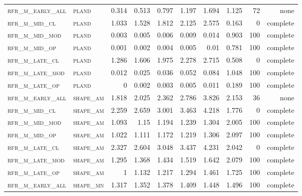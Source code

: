 \begin{landscape}
\begin{center}
\begin{footnotesize}
\begin{longtable}{llrrrrr|rrr}
\textsc{rfr\_m\_early\_all} & \textsc{pland     }   & 0.314   & 0.513   & 0.797   & 1.197    & 1.694    & 1.125   & 72  & none     \\
\textsc{rfr\_m\_mid\_cl   } & \textsc{pland     }   & 1.033   & 1.528   & 1.812   & 2.125    & 2.575    & 0.163   & 0   & complete \\
\textsc{rfr\_m\_mid\_mod  } & \textsc{pland     }   & 0.003   & 0.005   & 0.006   & 0.009    & 0.014    & 0.903   & 100 & complete \\
\textsc{rfr\_m\_mid\_op   } & \textsc{pland     }   & 0.001   & 0.002   & 0.004   & 0.005    & 0.01     & 0.781   & 100 & complete \\
\textsc{rfr\_m\_late\_cl  } & \textsc{pland     }   & 1.286   & 1.606   & 1.975   & 2.278    & 2.715    & 0.508   & 0   & complete \\
\textsc{rfr\_m\_late\_mod } & \textsc{pland     }   & 0.012   & 0.025   & 0.036   & 0.052    & 0.084    & 1.048   & 100 & complete \\
\textsc{rfr\_m\_late\_op  } & \textsc{pland     }   & 0       & 0.002   & 0.003   & 0.005    & 0.011    & 0.189   & 100 & complete \\
\textsc{rfr\_m\_early\_all} & \textsc{shape\_am }   & 1.818   & 2.025   & 2.362   & 2.786    & 3.826    & 2.153   & 36  & none     \\
\textsc{rfr\_m\_mid\_cl   } & \textsc{shape\_am }   & 2.259   & 2.659   & 3.001   & 3.463    & 4.218    & 1.776   & 0   & complete \\
\textsc{rfr\_m\_mid\_mod  } & \textsc{shape\_am }   & 1.093   & 1.15    & 1.194   & 1.239    & 1.304    & 2.005   & 100 & complete \\
\textsc{rfr\_m\_mid\_op   } & \textsc{shape\_am }   & 1.022   & 1.111   & 1.172   & 1.219    & 1.306    & 2.097   & 100 & complete \\
\textsc{rfr\_m\_late\_cl  } & \textsc{shape\_am }   & 2.327   & 2.604   & 3.048   & 3.437    & 4.231    & 2.042   & 0   & complete \\
\textsc{rfr\_m\_late\_mod } & \textsc{shape\_am }   & 1.295   & 1.368   & 1.434   & 1.519    & 1.642    & 2.079   & 100 & complete \\
\textsc{rfr\_m\_late\_op  } & \textsc{shape\_am }   & 1       & 1.132   & 1.217   & 1.294    & 1.461    & 1.725   & 100 & complete \\
\textsc{rfr\_m\_early\_all} & \textsc{shape\_mn }   & 1.317   & 1.352   & 1.378   & 1.409    & 1.448    & 1.496   & 100 & complete \\

\end{longtable}
\end{footnotesize}
\end{center}
\end{landscape}
